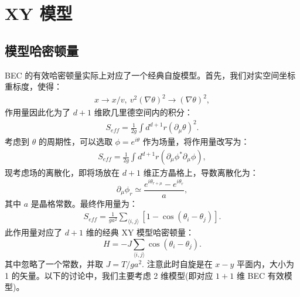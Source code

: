 \documentclass[10pt,UTF8]{ctexart}
\begin{document}
\section*{XY 模型}
\subsection*{模型哈密顿量}
\noindent
BEC 的有效哈密顿量实际上对应了一个经典自旋模型。首先，我们对实空间坐标重标度，使得：
\begin{eqnarray}
	x \rightarrow x/v,\ v^2(\nabla\theta)^2\rightarrow(\nabla\theta)^2,
\end{eqnarray}
作用量因此化为了 $d+1$ 维欧几里德空间内的积分：
\begin{eqnarray}
	S_{eff} = \frac{1}{2g} \int d^{d+1}r (\partial_\mu \theta)^2.
\end{eqnarray}
考虑到 $\theta$ 的周期性，可以选取 $\phi=e^{i\theta}$ 作为场量，将作用量改写为：
\begin{eqnarray}
	S_{eff} = \frac{1}{2g} \int d^{d+1}r (\partial_\mu \phi^*\partial_\mu \phi),
\end{eqnarray}
现考虑场的离散化，即将场放在 $d+1$ 维正方晶格上，导数离散化为：
\begin{equation}
	\partial_\mu \phi_r \simeq \frac{e^{i\theta_{r+\mu}}-e^{i\theta_r}}{a},
\end{equation}
其中 $a$ 是晶格常数。最终作用量为：
\begin{eqnarray}
	S_{eff} = \frac{1}{ga^2} \sum_{\langle i,j \rangle}[1-\cos(\theta_i-\theta_j)].
\end{eqnarray}
此作用量对应了 $d+1$ 维的经典 XY 模型哈密顿量：
\begin{equation}
	H = - J \sum_{\langle i,j \rangle} \cos(\theta_i - \theta_j).
\end{equation}
其中忽略了一个常数，并取 $J = T/ga^2$. 注意此时自旋是在 $x-y$ 平面内，大小为 1 的矢量。以下的讨论中，我们主要考虑 2 维模型(即对应 $1+1$ 维 BEC 有效模型)。
\end{document}
